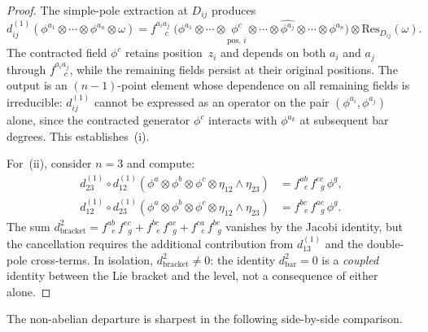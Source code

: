 \begin{proof}
The simple-pole extraction at $D_{ij}$ produces
\[
d_{ij}^{(1)}(\phi^{a_1} \otimes \cdots \otimes \phi^{a_n}
 \otimes \omega)
= f^{a_i a_j}_{\;\;\;\;c}\;
 \bigl(\phi^{a_1} \otimes \cdots \otimes
 \underset{\text{pos.\ }i}{\phi^c} \otimes \cdots
 \otimes \widehat{\phi^{a_j}} \otimes \cdots
 \otimes \phi^{a_n}\bigr)
 \otimes \mathrm{Res}_{D_{ij}}(\omega).
\]
The contracted field $\phi^c$ retains position~$z_i$ and depends on
both $a_i$ and $a_j$ through $f^{a_i a_j}_{\;\;\;\;c}$, while the
remaining fields persist at their original positions. The output is
an $(n{-}1)$-point element whose dependence on all remaining fields
is irreducible: $d_{ij}^{(1)}$ cannot be expressed as an operator on
the pair $(\phi^{a_i}, \phi^{a_j})$ alone, since the contracted
generator $\phi^c$ interacts with $\phi^{a_k}$ at subsequent bar
degrees. This establishes~(i).

For~(ii), consider $n = 3$ and compute:
\begin{align*}
d_{23}^{(1)} \circ d_{12}^{(1)}
 (\phi^a \otimes \phi^b \otimes \phi^c
 \otimes \eta_{12} \wedge \eta_{23})
&= f^{ab}_{\;\;e}\, f^{ec}_{\;\;g}\, \phi^g, \\
d_{12}^{(1)} \circ d_{23}^{(1)}
 (\phi^a \otimes \phi^b \otimes \phi^c
 \otimes \eta_{12} \wedge \eta_{23})
&= f^{bc}_{\;\;e}\, f^{ae}_{\;\;g}\, \phi^g.
\end{align*}
The sum $d_{\mathrm{bracket}}^2
= f^{ab}_{\;\;e}\, f^{ec}_{\;\;g}
+ f^{bc}_{\;\;e}\, f^{ae}_{\;\;g}
+ f^{ca}_{\;\;e}\, f^{be}_{\;\;g}$
vanishes by the Jacobi identity, but the cancellation requires the
additional contribution from $d_{13}^{(1)}$ and the double-pole
cross-terms. In isolation, $d_{\mathrm{bracket}}^2 \neq 0$: the
identity $d_{\mathrm{bar}}^2 = 0$ is a \emph{coupled} identity
between the Lie bracket and the level, not a consequence of either
alone.
\end{proof}

The non-abelian departure is sharpest in the following side-by-side
comparison.

